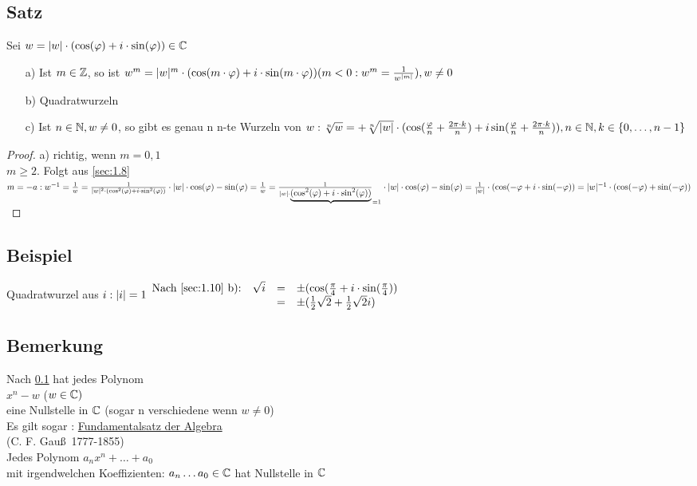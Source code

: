 \subsection[Satz: Komplexe Wurzeln]{Satz}\label{sec:1.10}
Sei $w = \lvert w \rvert \cdot (\cos(\varphi) + i \cdot \sin(\varphi)) \in \mathbb{C}$\\
\begin{enumerate}
\item[a)] Ist $m \in \mathbb{Z}$, so ist $w^m = \lvert w \rvert^m \cdot ( \cos(m \cdot \varphi) + i \cdot \sin(m \cdot \varphi))\\
( m < 0 : w^m = \frac{1}{w^{\mid m \mid}}), w \ne 0$
\item[b)] Quadratwurzeln
\item[c)] Ist $n \in \mathbb{N}, w \not = 0$, so gibt es genau n n-te Wurzeln von $w:\\
\sqrt[n]{w} = + \sqrt[n]{\lvert w \rvert} \cdot (\cos(\frac{\varphi}{n} + \frac{2\pi \cdot k}{n}) + i \sin(\frac{\varphi}{n}+ \frac{2\pi \cdot k}{n})), n \in \mathbb{N}  ,k \in \{0, \ldots,n-1\}$
\end{enumerate}
\begin{proof}
a) richtig, wenn $m=0,1$\\
$m \geq 2.$ Folgt aus \ref{sec:1.8}\\
$m=-a:\\
w^{-1} = \frac{1}{w} = \frac{1}{\lvert w \rvert^2 \cdot ( \cos^2(\varphi) + i \cdot \sin^2( \varphi))} \cdot \lvert w \rvert\cdot \cos(\varphi) - \sin(\varphi)\\
= \frac{1}{w} = \frac{1}{\lvert w \rvert \cdot \underbrace{( \cos^2(\varphi) + i \cdot \sin^2( \varphi))}}_{=1} \cdot \lvert w \rvert \cdot \cos(\varphi) - \sin(\varphi)\\
= \frac{1}{\lvert w \rvert} \cdot (\cos(-\varphi + i \cdot \sin(-\varphi)) = \lvert w \rvert^{-1} \cdot (\cos(-\varphi) + \sin(-\varphi))$\\
\end{proof}
\subsection{Beispiel}
Quadratwurzel aus $i:\\
\lvert i \rvert =1\\
\begin{array}{llcl}
\text{Nach \ref{sec:1.10} b):} &\sqrt{i}&=& \pm (\cos(\frac{\pi}{4} + i \cdot \sin(\frac{\pi}{4}))\\
& &=& \pm (\frac{1}{2}\sqrt{2} + \frac{1}{2}\sqrt{2}i)
\end{array}
$
\subsection{Bemerkung}
Nach \ref{sec:1.10} hat jedes Polynom\\
$ x^{n} -w$ ($w \in \mathbb{C})$\\
eine Nullstelle in $\mathbb{C}$ (sogar n verschiedene wenn $w \not = 0$)\\
Es gilt sogar : \underline{Fundamentalsatz der Algebra}\\
\hfill (C. F. Gau\ss\ 1777-1855)\\
Jedes Polynom $a_n x^n + \ldots + a_0$\\
mit irgendwelchen Koeffizienten: $a_n \ldots a_0 \in \mathbb{C}$ hat Nullstelle in $\mathbb{C}$
